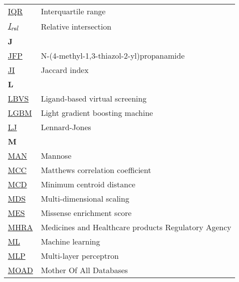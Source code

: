 \begin{longtable}[l]{@{}p{2.5cm}p{12cm}@{}}
\textmd{\href{https://en.wikipedia.org/wiki/Interquartile_range}{IQR}} & Interquartile range \\
\textmd{\href{https://www.nature.com/articles/s42003-024-05970-8}{\textit{I\textsubscript{rel}}}} & Relative intersection \\[0.3175cm]
\textbf{\large J} & \\[0.25cm]
\textmd{\href{https://www.ebi.ac.uk/pdbe-srv/pdbechem/chemicalCompound/show/JFP}{JFP}} & N-(4-methyl-1,3-thiazol-2-yl)propanamide \\
\textmd{\href{https://en.wikipedia.org/wiki/Jaccard_index}{JI}} & Jaccard index \\[0.3175cm]
\textbf{\large L} & \\[0.25cm]
\textmd{\href{https://en.wikipedia.org/wiki/Virtual_screening\#Ligand-based_methods_2}{LBVS}} & Ligand-based virtual screening \\
\textmd{\href{https://en.wikipedia.org/wiki/LightGBM}{LGBM}} & Light gradient boosting machine \\
\textmd{\href{https://en.wikipedia.org/wiki/Lennard-Jones_potential}{LJ}} & Lennard-Jones \\[0.3175cm]
\textbf{\large M} & \\[0.25cm]
\textmd{\href{https://www.ebi.ac.uk/pdbe-srv/pdbechem/chemicalCompound/show/MAN}{MAN}} & Mannose \\
\textmd{\href{https://en.wikipedia.org/wiki/Phi_coefficient}{MCC}} & Matthews correlation coefficient \\
\textmd{\href{https://jcheminf.biomedcentral.com/articles/10.1186/s13321-024-00923-z}{MCD}} & Minimum centroid distance \\
\textmd{\href{https://en.wikipedia.org/wiki/Multidimensional_scaling}{MDS}} & Multi-dimensional scaling \\
\textmd{\href{https://www.nature.com/articles/s42003-024-06117-5}{MES}} & Missense enrichment score \\
\textmd{\href{https://en.wikipedia.org/wiki/Medicines_and_Healthcare_products_Regulatory_Agency}{MHRA}} & Medicines and Healthcare products Regulatory Agency \\
\textmd{\href{https://en.wikipedia.org/wiki/Machine_learning}{ML}} & Machine learning \\
\textmd{\href{https://en.wikipedia.org/wiki/Multilayer_perceptron}{MLP}} & Multi-layer perceptron \\
\textmd{\href{https://www.nature.com/articles/s41598-023-29996-w}{MOAD}} & Mother Of All Databases \\

\end{longtable}
